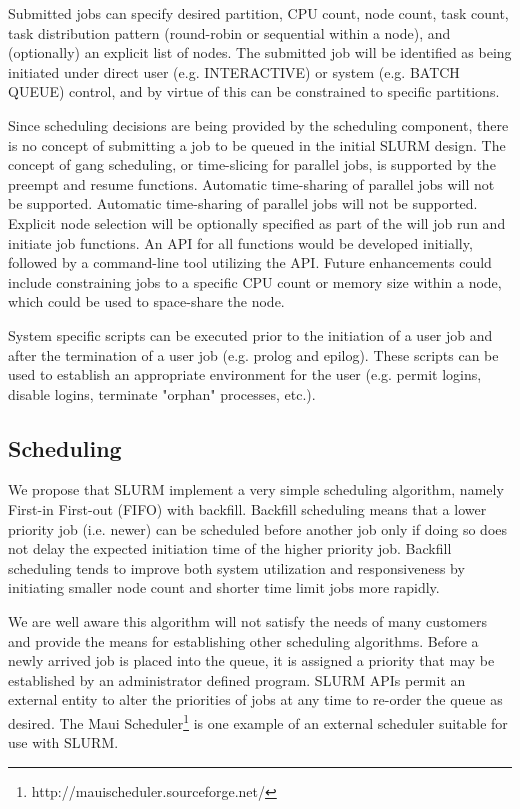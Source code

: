 Submitted jobs can specify desired partition, CPU count, node count, task 
count, task distribution pattern (round-robin or sequential within a node), 
and (optionally) an explicit list of nodes. The submitted job will be 
identified as being initiated under direct user (e.g. INTERACTIVE) or system 
(e.g. BATCH QUEUE) control, and by virtue of this can be constrained 
to specific partitions. 

Since scheduling decisions are being provided by the scheduling component,
there is no concept of submitting a job to be queued in the initial SLURM design. 
The concept of gang scheduling, or time-slicing for parallel jobs, is supported by the preempt and
resume functions. Automatic time-sharing of parallel jobs will not be
supported. Automatic time-sharing of parallel jobs will not be
supported. Explicit node selection will be optionally specified as part of the
will job run and initiate job functions. An API for all functions would be
developed initially, followed by a  command-line tool utilizing the API. Future
enhancements could include constraining jobs to a specific CPU count or memory
size within a node, which could be used to space-share the node.

System specific scripts can be executed prior to the initiation of a user job
and after the termination of a user job (e.g. prolog and epilog). These scripts
can be used to establish an appropriate environment for the user (e.g. permit
logins, disable logins, terminate "orphan" processes, etc.). 

\subsection{Scheduling}

We propose that SLURM implement a very simple scheduling algorithm, 
namely First-in First-out (FIFO) with backfill. Backfill scheduling 
means that a lower priority job (i.e. newer) can be scheduled before 
another job only if doing so does not delay the expected initiation 
time of the higher priority job. Backfill scheduling tends to improve 
both system utilization and responsiveness by initiating smaller 
node count and shorter time limit jobs more rapidly. 

We are well aware this algorithm will not satisfy the needs of many 
customers and provide the means for establishing other scheduling 
algorithms. Before a newly arrived job is placed into the queue, it 
is assigned a priority that may be established by an administrator 
defined program. SLURM APIs permit an external entity to alter the 
priorities of jobs at any time to re-order the queue as desired. 
The Maui Scheduler\footnote{http://mauischeduler.sourceforge.net/} 
is one example of an external scheduler suitable for use with SLURM.

